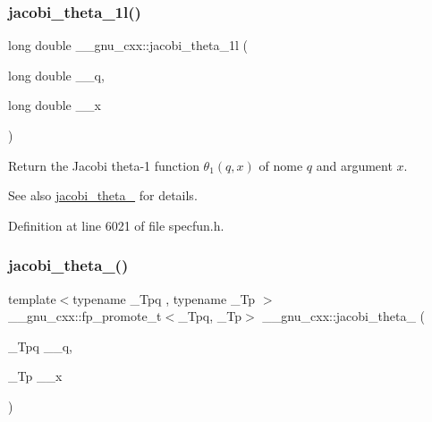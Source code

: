 \subsubsection{\texorpdfstring{jacobi\+\_\+theta\+\_\+1l()}{jacobi\_theta\_1l()}}
{\footnotesize\ttfamily long double \+\_\+\+\_\+gnu\+\_\+cxx\+::jacobi\+\_\+theta\+\_\+1l (\begin{DoxyParamCaption}\item[{long double}]{\+\_\+\+\_\+q,  }\item[{long double}]{\+\_\+\+\_\+x }\end{DoxyParamCaption})\hspace{0.3cm}{\ttfamily [inline]}}

Return the Jacobi theta-\/1 function $ \theta_1(q,x) $ of nome $ q $ and argument $ x $.

\begin{DoxySeeAlso}{See also}
\hyperlink{group__gnu__math__spec__func_ga996ca8c1fff75e2d4f196e99e0919933}{jacobi\+\_\+theta\+\_} for details. 
\end{DoxySeeAlso}


Definition at line 6021 of file specfun.\+h.

\mbox{\label{group__gnu__math__spec__func_gaf6b13dac1f112a870299d75cb4cf42cc}} 
\subsubsection{\texorpdfstring{jacobi\+\_\+theta\+\_()}{jacobi\_theta\_2()}}
{\footnotesize\ttfamily template$<$typename \+\_\+\+Tpq , typename \+\_\+\+Tp $>$ \\
\+\_\+\+\_\+gnu\+\_\+cxx\+::fp\+\_\+promote\+\_\+t$<$\+\_\+\+Tpq, \+\_\+\+Tp$>$ \+\_\+\+\_\+gnu\+\_\+cxx\+::jacobi\+\_\+theta\+\_ (\begin{DoxyParamCaption}\item[{\+\_\+\+Tpq}]{\+\_\+\+\_\+q,  }\item[{\+\_\+\+Tp}]{\+\_\+\+\_\+x }\end{DoxyParamCaption})\hspace{0.3cm}{\ttfamily [inline]}}

